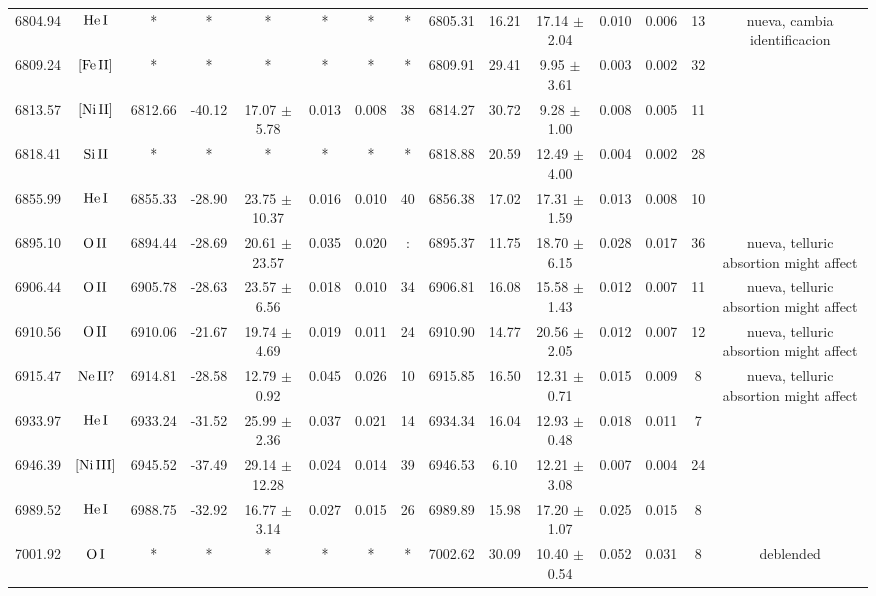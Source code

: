 \documentclass{article}
\begin{document}
\begin{table*}
\begin{adjustbox}{width=\textwidth}
\begin{tabular}{ccccccccccccccc}
6804.94 & $\mbox{He}\thinspace \mbox{I}$ & * & * & * & * & * & * & 6805.31 & 16.21 & 17.14 $\pm$ 2.04 & 0.010 & 0.006 & 13 &  nueva, cambia identificacion \\
6809.24 & $\mbox{[Fe}\thinspace \mbox{II]}$ & * & * & * & * & * & * & 6809.91 & 29.41 & 9.95 $\pm$ 3.61 & 0.003 & 0.002 & 32 &  \\
6813.57 & $\mbox{[Ni}\thinspace \mbox{II]}$ & 6812.66 & -40.12 & 17.07 $\pm$ 5.78 & 0.013 & 0.008 & 38 & 6814.27 & 30.72 & 9.28 $\pm$ 1.00 & 0.008 & 0.005 & 11 &  \\
6818.41 & $\mbox{Si}\thinspace \mbox{II}$ & * & * & * & * & * & * & 6818.88 & 20.59 & 12.49 $\pm$ 4.00 & 0.004 & 0.002 & 28 &  \\
6855.99 & $\mbox{He}\thinspace \mbox{I}$ & 6855.33 & -28.90 & 23.75 $\pm$ 10.37 & 0.016 & 0.010 & 40 & 6856.38 & 17.02 & 17.31 $\pm$ 1.59 & 0.013 & 0.008 & 10 &  \\
6895.10 & $\mbox{O}\thinspace \mbox{II}$ & 6894.44 & -28.69 & 20.61 $\pm$ 23.57 & 0.035 & 0.020 & : & 6895.37 & 11.75 & 18.70 $\pm$ 6.15 & 0.028 & 0.017 & 36 &  nueva, telluric absortion might affect \\
6906.44 & $\mbox{O}\thinspace \mbox{II}$ & 6905.78 & -28.63 & 23.57 $\pm$ 6.56 & 0.018 & 0.010 & 34 & 6906.81 & 16.08 & 15.58 $\pm$ 1.43 & 0.012 & 0.007 & 11 &  nueva, telluric absortion might affect \\
6910.56 & $\mbox{O}\thinspace \mbox{II}$ & 6910.06 & -21.67 & 19.74 $\pm$ 4.69 & 0.019 & 0.011 & 24 & 6910.90 & 14.77 & 20.56 $\pm$ 2.05 & 0.012 & 0.007 & 12 &  nueva, telluric absortion might affect \\
6915.47 & $\mbox{Ne}\thinspace \mbox{II?}$ & 6914.81 & -28.58 & 12.79 $\pm$ 0.92 & 0.045 & 0.026 & 10 & 6915.85 & 16.50 & 12.31 $\pm$ 0.71 & 0.015 & 0.009 & 8 &  nueva, telluric absortion might affect \\
6933.97 & $\mbox{He}\thinspace \mbox{I}$ & 6933.24 & -31.52 & 25.99 $\pm$ 2.36 & 0.037 & 0.021 & 14 & 6934.34 & 16.04 & 12.93 $\pm$ 0.48 & 0.018 & 0.011 & 7 &  \\
6946.39 & $\mbox{[Ni}\thinspace \mbox{III]}$ & 6945.52 & -37.49 & 29.14 $\pm$ 12.28 & 0.024 & 0.014 & 39 & 6946.53 & 6.10 & 12.21 $\pm$ 3.08 & 0.007 & 0.004 & 24 &  \\
6989.52 & $\mbox{He}\thinspace \mbox{I}$ & 6988.75 & -32.92 & 16.77 $\pm$ 3.14 & 0.027 & 0.015 & 26 & 6989.89 & 15.98 & 17.20 $\pm$ 1.07 & 0.025 & 0.015 & 8 &  \\
7001.92 & $\mbox{O}\thinspace \mbox{I}$ & * & * & * & * & * & * & 7002.62 & 30.09 & 10.40 $\pm$ 0.54 & 0.052 & 0.031 & 8 &  deblended \\

\end{tabular}
\end{adjustbox}
\end{table*}
\end{document}
